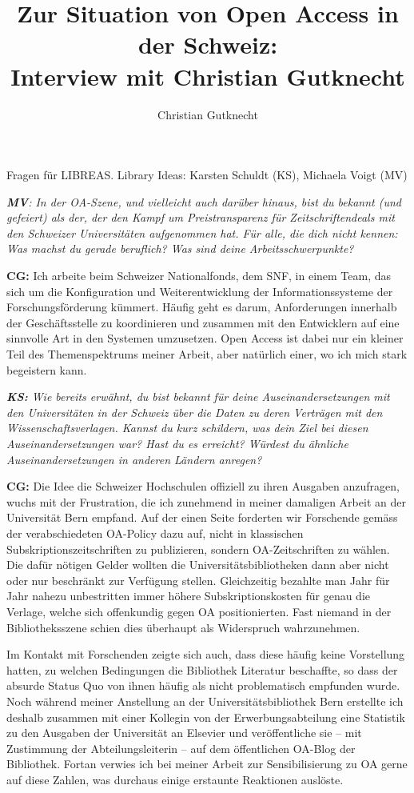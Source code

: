 \documentclass[a4paper,
fontsize=11pt,
oneside,
numbers=noperiodatend,
parskip=half-,
bibliography=totoc,
final
]{scrartcl}
\title{\LARGE{Zur Situation von Open Access in der Schweiz:\\ Interview mit Christian Gutknecht}} %
\author{Christian Gutknecht} %
\date{}
\begin{document}
\maketitle
\thispagestyle{fancyplain} 


Fragen für LIBREAS. Library Ideas: Karsten Schuldt (KS), Michaela Voigt
(MV)

\emph{\textbf{MV}: In der OA-Szene, und vielleicht auch darüber hinaus,
bist du bekannt (und gefeiert) als der, der den Kampf um
Preistransparenz für Zeitschriftendeals mit den Schweizer Universitäten
aufgenommen hat. Für alle, die dich nicht kennen: Was machst du gerade
beruflich? Was sind deine Arbeitsschwerpunkte?}

\textbf{CG:} Ich arbeite beim Schweizer Nationalfonds, dem SNF, in einem
Team, das sich um die Konfiguration und Weiterentwicklung der
Informationssysteme der Forschungsförderung kümmert. Häufig geht es
darum, Anforderungen innerhalb der Geschäftsstelle zu koordinieren und
zusammen mit den Entwicklern auf eine sinnvolle Art in den Systemen
umzusetzen. Open Access ist dabei nur ein kleiner Teil des
Themenspektrums meiner Arbeit, aber natürlich einer, wo ich mich stark
begeistern kann.

\emph{\textbf{KS:} Wie bereits erwähnt, du bist bekannt für deine
Auseinandersetzungen mit den Universitäten in der Schweiz über die Daten
zu deren Verträgen mit den Wissenschaftsverlagen. Kannst du kurz
schildern, was dein Ziel bei diesen Auseinandersetzungen war? Hast du es
erreicht? Würdest du ähnliche Auseinandersetzungen in anderen Ländern
anregen?}

\textbf{CG:} Die Idee die Schweizer Hochschulen offiziell zu ihren
Ausgaben anzufragen, wuchs mit der Frustration, die ich zunehmend in
meiner damaligen Arbeit an der Universität Bern empfand. Auf der einen
Seite forderten wir Forschende gemäss der verabschiedeten OA-Policy dazu
auf, nicht in klassischen Subskriptionszeitschriften zu publizieren,
sondern OA-Zeitschriften zu wählen. Die dafür nötigen Gelder wollten die
Universitätsbibliotheken dann aber nicht oder nur beschränkt zur
Verfügung stellen. Gleichzeitig bezahlte man Jahr für Jahr nahezu
unbestritten immer höhere Subskriptionskosten für genau die Verlage,
welche sich offenkundig gegen OA positionierten. Fast niemand in der
Bibliotheksszene schien dies überhaupt als Widerspruch wahrzunehmen.

Im Kontakt mit Forschenden zeigte sich auch, dass diese häufig keine
Vorstellung hatten, zu welchen Bedingungen die Bibliothek Literatur
beschaffte, so dass der absurde Status Quo von ihnen häufig als nicht
problematisch empfunden wurde. Noch während meiner Anstellung an der
Universitätsbibliothek Bern erstellte ich deshalb zusammen mit einer
Kollegin von der Erwerbungsabteilung eine Statistik zu den Ausgaben der
Universität an Elsevier und veröffentliche sie -- mit Zustimmung der
Abteilungsleiterin -- auf dem öffentlichen OA-Blog der Bibliothek.
Fortan verwies ich bei meiner Arbeit zur Sensibilisierung zu OA gerne
auf diese Zahlen, was durchaus einige erstaunte Reaktionen auslöste.
\end{document}
